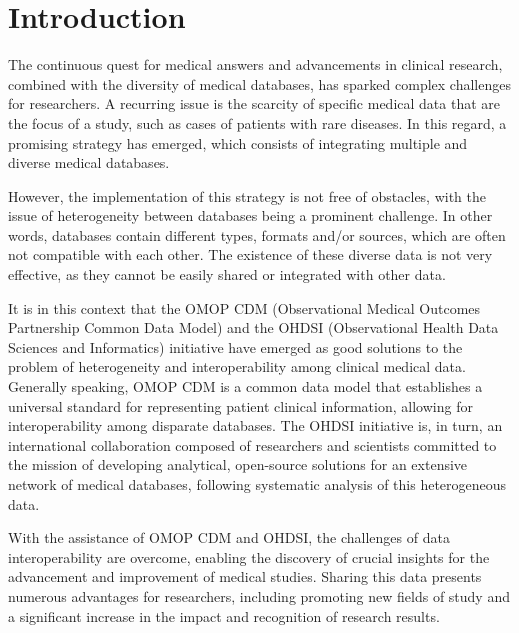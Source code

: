 \chapter{Introduction}
\label{chapter:introduction}

%
% 
%


The continuous quest for medical answers and advancements in clinical research, combined with the diversity of medical databases, has sparked complex challenges for researchers. A recurring issue is the scarcity of specific medical data that are the focus of a study, such as cases of patients with rare diseases. In this regard, a promising strategy has emerged, which consists of integrating multiple and diverse medical databases.

However, the implementation of this strategy is not free of obstacles, with the issue of heterogeneity between databases being a prominent challenge. In other words, databases contain different types, formats and/or sources, which are often not compatible with each other. The existence of these diverse data is not very effective, as they cannot be easily shared or integrated with other data.

It is in this context that the OMOP CDM (Observational Medical Outcomes Partnership Common Data Model) and the OHDSI (Observational Health Data Sciences and Informatics) initiative have emerged as good solutions to the problem of heterogeneity and interoperability among clinical medical data. Generally speaking, OMOP CDM is a common data model that establishes a universal standard for representing patient clinical information, allowing for interoperability among disparate databases. The OHDSI initiative is, in turn, an international collaboration composed of researchers and scientists committed to the mission of developing analytical, open-source solutions for an extensive network of medical databases, following systematic analysis of this heterogeneous data.

With the assistance of OMOP CDM and OHDSI, the challenges of data interoperability are overcome, enabling the discovery of crucial insights for the advancement and improvement of medical studies. Sharing this data presents numerous advantages for researchers, including promoting new fields of study and a significant increase in the impact and recognition of research results.


